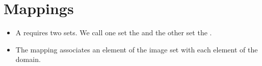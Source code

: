 \chapter{Mappings}
\label{mapping}

\begin{itemize}
\item
A  requires two sets. We call one set the  and the other set the .
\item
The mapping associates an element of the image set with each element of the domain.


\end{itemize}
